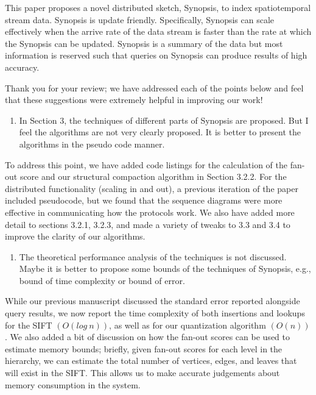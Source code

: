 \documentclass{article}
\begin{document}
This paper proposes a novel distributed sketch, Synopsis, to index
spatiotemporal stream data. Synopsis is update friendly. Specifically,
Synopsis can scale effectively when the arrive rate of the data stream
is faster than the rate at which the Synopsis can be updated. Synopsis
is a summary of the data but most information is reserved such that
queries on Synopsis can produce results of high accuracy.

\begin{tcolorbox}
Thank you for your review; we have addressed each of the points below
and feel that these suggestions were extremely helpful in improving our
work!
\end{tcolorbox}

\begin{enumerate}
\def\labelenumi{\arabic{enumi})}
\item
  In Section 3, the techniques of different parts of Synopsis are
  proposed. But I feel the algorithms are not very clearly proposed. It
  is better to present the algorithms in the pseudo code manner.
\end{enumerate}

\begin{tcolorbox}
To address this point, we have added code listings for the calculation
of the fan-out score and our structural compaction algorithm in Section
3.2.2. For the distributed functionality (scaling in and out), a
previous iteration of the paper included pseudocode, but we found that
the sequence diagrams were more effective in communicating how the
protocols work. We also have added more detail to sections 3.2.1, 3.2.3,
and made a variety of tweaks to 3.3 and 3.4 to improve the clarity of
our algorithms.
\end{tcolorbox}

\begin{enumerate}
\def\labelenumi{\arabic{enumi})}
\setcounter{enumi}{1}
\item
  The theoretical performance analysis of the techniques is not
  discussed. Maybe it is better to propose some bounds of the techniques
  of Synopsis, e.g., bound of time complexity or bound of error.
\end{enumerate}

\begin{tcolorbox}
While our previous manuscript discussed the standard error reported
alongside query results, we now report the time complexity of both
insertions and lookups for the SIFT $(O(log\ n))$, as well as for our
quantization algorithm $(O(n))$. We also added a bit of discussion on how
the fan-out scores can be used to estimate memory bounds; briefly, given
fan-out scores for each level in the hierarchy, we can estimate the
total number of vertices, edges, and leaves that will exist in the SIFT.
This allows us to make accurate judgements about memory consumption in
the system.
\end{tcolorbox}
\end{document}

